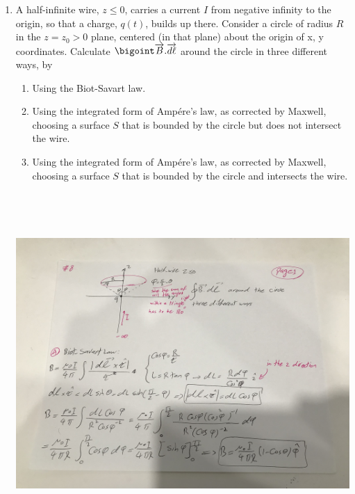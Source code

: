 \documentclass[fleqn]{article}
\begin{document}
\begin{enumerate}
    \pagebreak

    \item A half-infinite wire, $z\leq 0$, carries a current $I$ from negative infinity to the origin, so that a 
    charge, $q(t)$, builds up there. Consider a circle of radius $R$ in the $z=z_0 > 0$ plane, centered (in that plane) about the
    origin of x, y coordinates. Calculate $\bigoint \overrightarrow{B}.\overrightarrow{d\ell}$ around the circle in three
    different ways, by
    \begin{enumerate}
      \item Using the Biot-Savart law.

      \item Using the integrated form of Ampére’s law, as corrected by Maxwell, choosing a surface $S$ that is 
      bounded by the circle but does not intersect the wire.

      \item Using the integrated form of Ampére’s law, as corrected by Maxwell, choosing a surface $S$ that is 
      bounded by the circle and intersects the wire.
    \end{enumerate}

    \includegraphics[height=13cm, width=15cm]{8A.jpg}

    \pagebreak


\end{enumerate}
\end{document}
